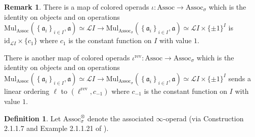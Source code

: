 \documentclass{article}
\newcommand{\Associnv}{\mathrm{Assoc}_\sigma}
\theoremstyle{definition}
\newtheorem{definition}[theorem]{Definition}
\newtheorem{remark}[theorem]{Remark}
\begin{document}
\begin{remark}\label{rmk:assoc_opd_to_assoc_inv_opd}
    There is a map of colored operads $ \iota \colon \mathrm{Assoc} \to \Associnv $ which is the identity on objects and on operations $ \mathrm{Mul}_{\mathrm{Assoc}}\left(\left\{\mathfrak{a}_i\right\}_{i \in I}, \mathfrak{a}\right) \simeq  \mathcal{L}I \to \mathrm{Mul}_{\Associnv}\left(\left\{\mathfrak{a}_i\right\}_{i \in I}, \mathfrak{a}\right) \simeq  \mathcal{L}I \times \{\pm 1\}^I $ is $ \mathrm{id}_{\mathcal{L}I} \times \{ c_1\} $ where $ c_1 $ is the constant function on $ I $ with value $ 1 $. 

    There is another map of colored operads $ \iota^{\mathrm{rev}} \colon \mathrm{Assoc} \to \Associnv $ which is the identity on objects and on operations $ \mathrm{Mul}_{\mathrm{Assoc}}\left(\left\{\mathfrak{a}_i\right\}_{i \in I}, \mathfrak{a}\right) \simeq  \mathcal{L}I \to \mathrm{Mul}_{\Associnv}\left(\left\{\mathfrak{a}_i\right\}_{i \in I}, \mathfrak{a}\right) \simeq  \mathcal{L}I \times \{\pm 1\}^I $ sends a linear ordering $ \ell $ to $ (\ell^{\mathrm{rev}}, c_{-1})$ where $ c_{-1} $ is the constant function on $ I $ with value $ 1 $. 
\end{remark}
\begin{definition}\label{defn:infty_operad_monoid_with_involution}
    Let $ \Associnv^\otimes $ denote the associated $ \infty $-operad (via Construction 2.1.1.7 and Example 2.1.1.21 of \cite{LurHA}). 
\end{definition} 
\end{document}
